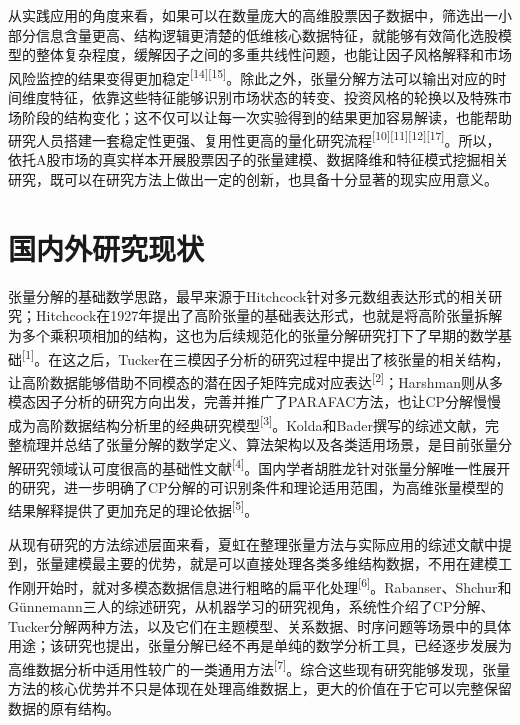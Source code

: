从实践应用的角度来看，如果可以在数量庞大的高维股票因子数据中，筛选出一小部分信息含量更高、结构逻辑更清楚的低维核心数据特征，就能够有效简化选股模型的整体复杂程度，缓解因子之间的多重共线性问题，也能让因子风格解释和市场风险监控的结果变得更加稳定\textsuperscript{[14][15]}。除此之外，张量分解方法可以输出对应的时间维度特征，依靠这些特征能够识别市场状态的转变、投资风格的轮换以及特殊市场阶段的结构变化；这不仅可以让每一次实验得到的结果更加容易解读，也能帮助研究人员搭建一套稳定性更强、复用性更高的量化研究流程\textsuperscript{[10][11][12][17]}。所以，依托A股市场的真实样本开展股票因子的张量建模、数据降维和特征模式挖掘相关研究，既可以在研究方法上做出一定的创新，也具备十分显著的现实应用意义。

\section{国内外研究现状}

张量分解的基础数学思路，最早来源于Hitchcock针对多元数组表达形式的相关研究；Hitchcock在1927年提出了高阶张量的基础表达形式，也就是将高阶张量拆解为多个乘积项相加的结构，这也为后续规范化的张量分解研究打下了早期的数学基础\textsuperscript{[1]}。在这之后，Tucker在三模因子分析的研究过程中提出了核张量的相关结构，让高阶数据能够借助不同模态的潜在因子矩阵完成对应表达\textsuperscript{[2]}；Harshman则从多模态因子分析的研究方向出发，完善并推广了PARAFAC方法，也让CP分解慢慢成为高阶数据结构分析里的经典研究模型\textsuperscript{[3]}。Kolda和Bader撰写的综述文献，完整梳理并总结了张量分解的数学定义、算法架构以及各类适用场景，是目前张量分解研究领域认可度很高的基础性文献\textsuperscript{[4]}。国内学者胡胜龙针对张量分解唯一性展开的研究，进一步明确了CP分解的可识别条件和理论适用范围，为高维张量模型的结果解释提供了更加充足的理论依据\textsuperscript{[5]}。

从现有研究的方法综述层面来看，夏虹在整理张量方法与实际应用的综述文献中提到，张量建模最主要的优势，就是可以直接处理各类多维结构数据，不用在建模工作刚开始时，就对多模态数据信息进行粗略的扁平化处理\textsuperscript{[6]}。Rabanser、Shchur和Günnemann三人的综述研究，从机器学习的研究视角，系统性介绍了CP分解、Tucker分解两种方法，以及它们在主题模型、关系数据、时序问题等场景中的具体用途；该研究也提出，张量分解已经不再是单纯的数学分析工具，已经逐步发展为高维数据分析中适用性较广的一类通用方法\textsuperscript{[7]}。综合这些现有研究能够发现，张量方法的核心优势并不只是体现在处理高维数据上，更大的价值在于它可以完整保留数据的原有结构。

